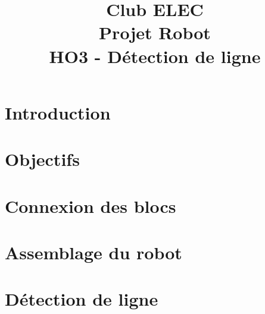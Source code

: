 \documentclass[a4paper,10pt,twoside]{article}
\title{
	\vspace{2.5cm}
	\normalfont \normalsize
	\huge Club ELEC\\
	\vspace{2.5cm}
	\huge Projet Robot\\
	\vspace{.25cm}
	\Large HO3 - Détection de ligne
	\vspace{2.5cm}
	\centering
}
\begin{document}
\renewcommand{\figurename}{Fig.}
\renewcommand{\thepage}{\roman{page}}
\setcounter{page}{1}

\maketitle
\newpage
{}
\pagestyle{main}

\newpage
\null
\thispagestyle{empty}
\newpage
\clearpage

\setcounter{page}{1}

\section*{Introduction}


\section*{Objectifs}


\section*{Connexion des blocs}


\section*{Assemblage du robot}


\section*{Détection de ligne}

\end{document}

